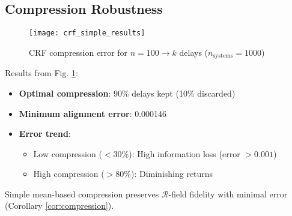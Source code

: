 \subsection{Compression Robustness}
\begin{figure}[h]
  \centering
  \texttt{[image: crf\_simple\_results]}
  \caption{CRF compression error for $n=100 \to k$ delays ($n_{\text{systems}}=1000$)}
  \label{fig:compression}
\end{figure}
Results from Fig. \ref{fig:compression}:
\begin{itemize}
  \item \textbf{Optimal compression}: 90\% delays kept (10\% discarded)
  \item \textbf{Minimum alignment error}: 0.000146
  \item \textbf{Error trend}: 
    \begin{itemize}
      \item Low compression ($<30\%$): High information loss (error $>0.001$)
      \item High compression ($>80\%$): Diminishing returns
    \end{itemize}
\end{itemize}
Simple mean-based compression preserves $\mathcal{R}$-field fidelity with minimal error (Corollary \ref{cor:compression}).
